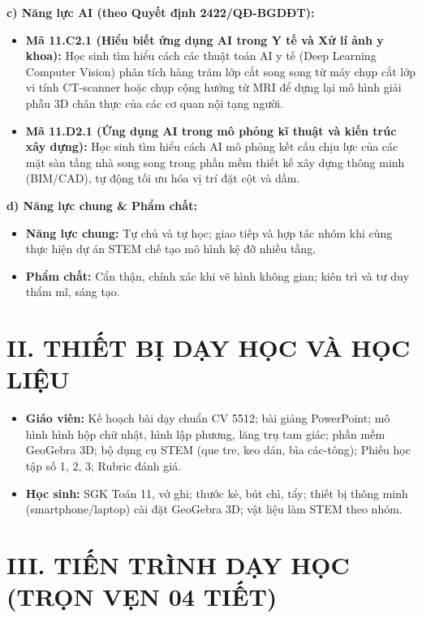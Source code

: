 \documentclass[12pt, a4paper]{article}
\begin{document}
\textbf{c) Năng lực AI (theo Quyết định 2422/QĐ-BGDĐT):}
\begin{itemize}[leftmargin=1.5em]
    \item \textbf{Mã 11.C2.1 (Hiểu biết ứng dụng AI trong Y tế và Xử lí ảnh y khoa):} Học sinh tìm hiểu cách các thuật toán AI y tế (Deep Learning Computer Vision) phân tích hàng trăm lớp cắt song song từ máy chụp cắt lớp vi tính CT-scanner hoặc chụp cộng hưởng từ MRI để dựng lại mô hình giải phẫu 3D chân thực của các cơ quan nội tạng người.
    \item \textbf{Mã 11.D2.1 (Ứng dụng AI trong mô phỏng kĩ thuật và kiến trúc xây dựng):} Học sinh tìm hiểu cách AI mô phỏng kết cấu chịu lực của các mặt sàn tầng nhà song song trong phần mềm thiết kế xây dựng thông minh (BIM/CAD), tự động tối ưu hóa vị trí đặt cột và dầm.
\end{itemize}

\textbf{d) Năng lực chung \& Phẩm chất:}
\begin{itemize}[leftmargin=1.5em]
    \item \textbf{Năng lực chung:} Tự chủ và tự học; giao tiếp và hợp tác nhóm khi cùng thực hiện dự án STEM chế tạo mô hình kệ đỡ nhiều tầng.
    \item \textbf{Phẩm chất:} Cẩn thận, chính xác khi vẽ hình không gian; kiên trì và tư duy thẩm mĩ, sáng tạo.
\end{itemize}

\section*{II. THIẾT BỊ DẠY HỌC VÀ HỌC LIỆU}
\begin{itemize}[leftmargin=1.5em]
    \item \textbf{Giáo viên:} Kế hoạch bài dạy chuẩn CV 5512; bài giảng PowerPoint; mô hình hình hộp chữ nhật, hình lập phương, lăng trụ tam giác; phần mềm GeoGebra 3D; bộ dụng cụ STEM (que tre, keo dán, bìa các-tông); Phiếu học tập số 1, 2, 3; Rubric đánh giá.
    \item \textbf{Học sinh:} SGK Toán 11, vở ghi; thước kẻ, bút chì, tẩy; thiết bị thông minh (smartphone/laptop) cài đặt GeoGebra 3D; vật liệu làm STEM theo nhóm.
\end{itemize}

\section*{III. TIẾN TRÌNH DẠY HỌC (TRỌN VẸN 04 TIẾT)}
\end{document}
